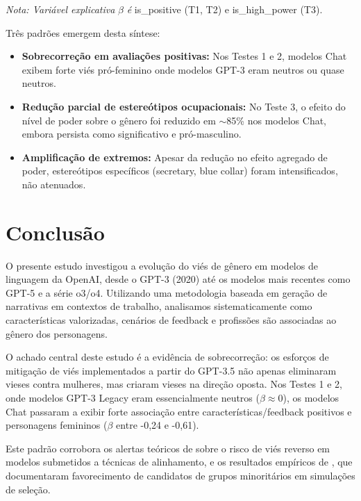 \documentclass[12pt,a4paper]{article}
\begin{document}
\textit{Nota: Variável explicativa} $\beta$ \textit{é} is\_positive (T1, T2) e is\_high\_power
(T3).

Três padrões emergem desta síntese:

\begin{itemize}
\item \textbf{Sobrecorreção em avaliações positivas:} Nos Testes 1 e 2, modelos Chat exibem forte viés pró-feminino onde modelos GPT-3 eram neutros ou quase neutros.

\item \textbf{Redução parcial de estereótipos ocupacionais:} No Teste 3, o efeito do nível de poder sobre o gênero foi reduzido em $\sim$85\% nos modelos Chat, embora persista como significativo e pró-masculino.

\item \textbf{Amplificação de extremos:} Apesar da redução no efeito agregado de poder, estereótipos específicos (secretary, blue collar) foram intensificados, não atenuados.
\end{itemize}




\section{Conclusão}


O presente estudo investigou a evolução do viés de gênero em modelos de
linguagem da OpenAI, desde o GPT-3 (2020) até os modelos mais recentes
como GPT-5 e a série o3/o4. Utilizando uma metodologia baseada em
geração de narrativas em contextos de trabalho, analisamos
sistematicamente como características valorizadas, cenários de feedback
e profissões são associadas ao gênero dos personagens.

O achado central deste estudo é a evidência de sobrecorreção: os
esforços de mitigação de viés implementados a partir do GPT-3.5 não
apenas eliminaram vieses contra mulheres, mas criaram vieses na direção
oposta. Nos Testes 1 e 2, onde modelos GPT-3 Legacy eram essencialmente
neutros ($\beta \approx 0$), os modelos Chat passaram a exibir forte associação
entre características/feedback positivos e personagens femininos ($\beta$
entre -0,24 e -0,61).

Este padrão corrobora os alertas teóricos de \citet{liu2025} sobre o
risco de viés reverso em modelos submetidos a técnicas de alinhamento, e
os resultados empíricos de \citet{karvonen2025}, que documentaram
favorecimento de candidatos de grupos minoritários em simulações de
seleção.
\end{document}
